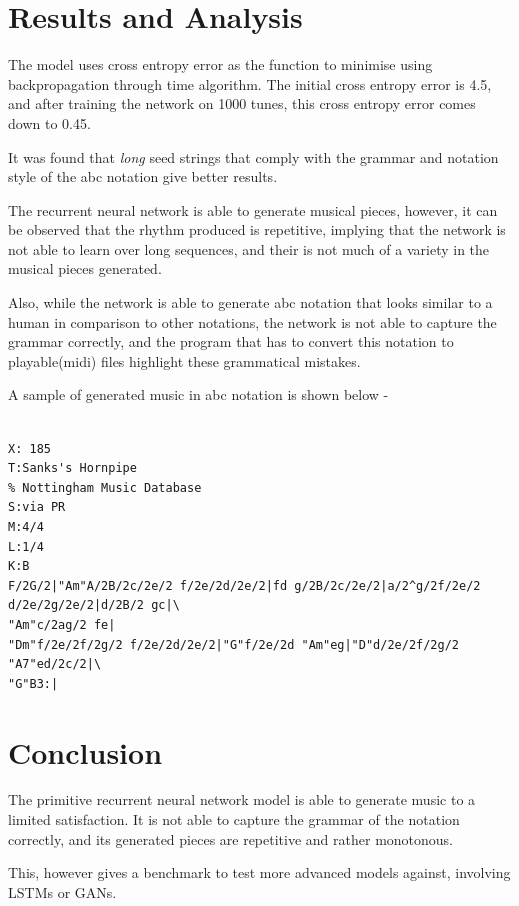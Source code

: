 \documentclass[11pt]{article}
\begin{document}
\section{Results and Analysis}
The model uses cross entropy error as the function to minimise using backpropagation through time algorithm. The initial cross entropy error is 4.5, and after training the network on 1000 tunes, this cross entropy error comes down to 0.45.

It was found that \emph{long} seed strings that comply with the grammar and notation style of the abc notation give better results.

The recurrent neural network is able to generate musical pieces, however, it can be observed that the rhythm produced is repetitive, implying that the network is not able to learn over long sequences, and their is not much of a variety in the musical pieces generated.

Also, while the network is able to generate abc notation that looks similar to a human in comparison to other notations, the network is not able to capture the grammar correctly, and the program that has to convert this notation to playable(midi) files highlight these grammatical mistakes.

A sample of generated music in abc notation is shown below - 

\begin{verbatim}

X: 185
T:Sanks's Hornpipe
% Nottingham Music Database
S:via PR
M:4/4
L:1/4
K:B
F/2G/2|"Am"A/2B/2c/2e/2 f/2e/2d/2e/2|fd g/2B/2c/2e/2|a/2^g/2f/2e/2 
d/2e/2g/2e/2|d/2B/2 gc|\
"Am"c/2ag/2 fe|
"Dm"f/2e/2f/2g/2 f/2e/2d/2e/2|"G"f/2e/2d "Am"eg|"D"d/2e/2f/2g/2 "A7"ed/2c/2|\
"G"B3:|

\end{verbatim}
\section{Conclusion}
The primitive recurrent neural network model is able to generate music to a limited satisfaction. It is not able to capture the grammar of the notation correctly, and its generated pieces are repetitive and rather monotonous.

This, however gives a benchmark to test more advanced models against, involving LSTMs or GANs.
\end{document}
